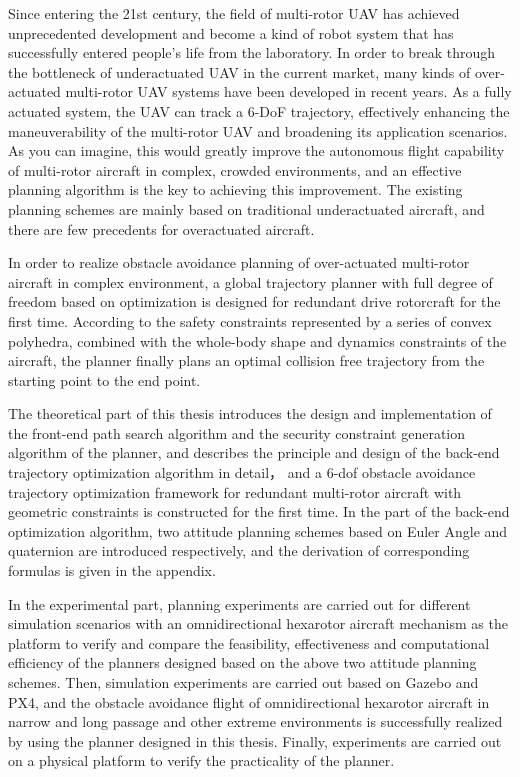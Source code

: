 \begin{eabstract}
  Since entering the 21st century, the field of multi-rotor UAV has achieved unprecedented development and become a kind of robot system that has successfully entered people's life from the laboratory.
In order to break through the bottleneck of underactuated UAV in the current market, many kinds of over-actuated multi-rotor UAV systems have been developed in recent years.
As a fully actuated system, the UAV can track a 6-DoF trajectory, effectively enhancing the maneuverability of the multi-rotor UAV and broadening its application scenarios.
As you can imagine, this would greatly improve the autonomous flight capability of multi-rotor aircraft in complex, crowded environments, and an effective planning algorithm is the key to achieving this improvement.
The existing planning schemes are mainly based on traditional underactuated aircraft, and there are few precedents for overactuated aircraft.

In order to realize obstacle avoidance planning of over-actuated multi-rotor aircraft in complex environment, a global trajectory planner with full degree of freedom based on optimization is designed for redundant drive rotorcraft for the first time.
According to the safety constraints represented by a series of convex polyhedra, combined with the whole-body shape and dynamics constraints of the aircraft, the planner finally plans an optimal collision free trajectory from the starting point to the end point.

The theoretical part of this thesis introduces the design and implementation of the front-end path search algorithm and the security constraint generation algorithm of the planner, and describes the principle and design of the back-end trajectory optimization algorithm in detail，
and a 6-dof obstacle avoidance trajectory optimization framework for redundant multi-rotor aircraft with geometric constraints is constructed for the first time.
In the part of the back-end optimization algorithm, two attitude planning schemes based on Euler Angle and quaternion are introduced respectively, and the derivation of corresponding formulas is given in the appendix.

In the experimental part, planning experiments are carried out for different simulation scenarios with an omnidirectional hexarotor aircraft mechanism as the platform to verify and compare the feasibility, effectiveness and computational efficiency of the planners designed based on the above two attitude planning schemes.
Then, simulation experiments are carried out based on Gazebo and PX4, and the obstacle avoidance flight of omnidirectional hexarotor aircraft in narrow and long passage and other extreme environments is successfully realized by using the planner designed in this thesis.
Finally, experiments are carried out on a physical platform to verify the practicality of the planner.
\end{eabstract}

